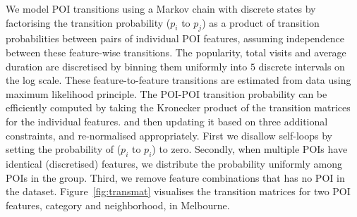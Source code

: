 We model POI transitions using a Markov chain with discrete %
states by factorising the transition probability ($p_i$ to $p_j$) %
as a product of transition probabilities between pairs of individual POI features, %
assuming independence between these feature-wise transitions.
The popularity, total visits and average duration are discretised by binning
them uniformly into $5$ discrete intervals on the log scale.
These feature-to-feature transitions are estimated from data using maximum likelihood principle.
The POI-POI transition probability can be efficiently computed by taking 
the Kronecker product of
the transition matrices for the individual features. 
and then updating it based on three additional constraints, and re-normalised appropriately.
First we disallow self-loops by setting the probability of ($p_i$ to $p_i$) to zero.
Secondly, when multiple POIs have identical (discretised) features, we distribute the probability uniformly among POIs in the group.
Third, we remove feature combinations that has no POI in the dataset. 
Figure~\ref{fig:transmat} visualises the transition matrices for two POI features, category and neighborhood, in Melbourne.
